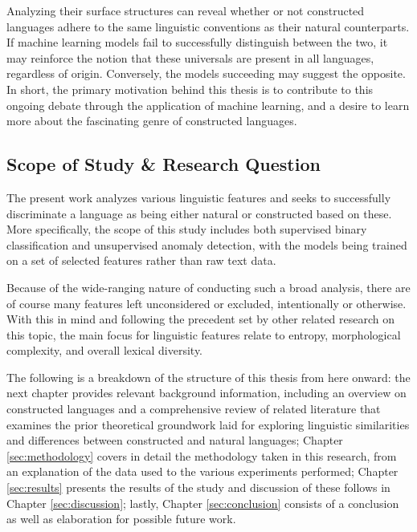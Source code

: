 \documentclass[12pt,a4paper]{article}
\numberwithin{figure}{section}
\numberwithin{table}{section}
\numberwithin{definition}{section}
\begin{document}
Analyzing their surface structures can reveal whether or not constructed languages adhere to the same linguistic conventions as their natural counterparts. If machine learning models fail to successfully distinguish between the two, it may reinforce the notion that these universals are present in all languages, regardless of origin. Conversely, the models succeeding may suggest the opposite. In short, the primary motivation behind this thesis is to contribute to this ongoing debate through the application of machine learning, and a desire to learn more about the fascinating genre of constructed languages.


\subsection{Scope of Study \& Research Question}
\label{ssec:scope}


The present work analyzes various linguistic features and seeks to successfully discriminate a language as being either natural or constructed based on these. More specifically, the scope of this study includes both supervised binary classification and unsupervised anomaly detection, with the models being trained on a set of selected features rather than raw text data. 

Because of the wide-ranging nature of conducting such a broad analysis, there are of course many features left unconsidered or excluded, intentionally or otherwise. With this in mind and following the precedent set by other related research on this topic, the main focus for linguistic features relate to entropy, morphological complexity, and overall lexical diversity.

The following is a breakdown of the structure of this thesis from here onward: the next chapter provides relevant background information, including an overview on constructed languages and a comprehensive review of related literature that examines the prior theoretical groundwork laid for exploring linguistic similarities and differences between constructed and natural languages; Chapter \ref{sec:methodology} covers in detail the methodology taken in this research, from an explanation of the data used to the various experiments performed; Chapter \ref{sec:results} presents the results of the study and discussion of these follows in Chapter \ref{sec:discussion}; lastly, Chapter \ref{sec:conclusion} consists of a conclusion as well as elaboration for possible future work.
\end{document}
